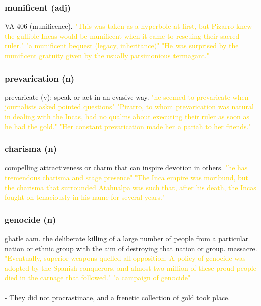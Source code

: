 \documentclass{proc}
\begin{document}
	\subsubsection{\textcolor{brickred}{munificent} (adj)}
	VA 406 (munificence).
	\textcolor{gold}{"This was taken as a hyperbole at first, but Pizarro knew the gullible Incas would be munificent when it came to rescuing their sacred ruler." "a munificent bequest (legacy, inheritance)" "He was surprised by the munificent gratuity given by the usually parsimonious termagant."}
	
	\subsubsection{\textcolor{brickred}{prevarication} (n)}
	prevaricate (v): speak or act in an evasive way.
	\textcolor{gold}{"he seemed to prevaricate when journalists asked pointed questions" "Pizarro, to whom prevarication was natural in dealing with the Incas, had no qualms about executing their ruler as soon as he had the gold." "Her constant prevarication made her a pariah to her friends."}
	
	\subsubsection{\textcolor{brickred}{charisma} (n)}
	compelling attractiveness or \underline{charm} that can inspire devotion in others.
	\textcolor{gold}{"he has tremendous charisma and stage presence" "The Inca empire was moribund, but the charisma that surrounded Atahualpa was such that, after his death, the Incas fought on tenaciously in his name for several years."}
	
	\subsubsection{\textcolor{brickred}{genocide} (n)}
	ghatle aam. the deliberate killing of a large number of people from a particular nation or ethnic group with the aim of destroying that nation or group. massacre.
	\textcolor{gold}{"Eventually, superior weapons quelled all opposition. A policy of genocide was adopted by the Spanish conquerors, and almost two million of these proud people died in the carnage that followed." "a campaign of genocide"}\\\\
	- They did not procrastinate, and a frenetic collection of gold took place.
	
	\newpage
	\setcounter{section}{46}
	\setcounter{subsection}{0}
	
\end{document}
